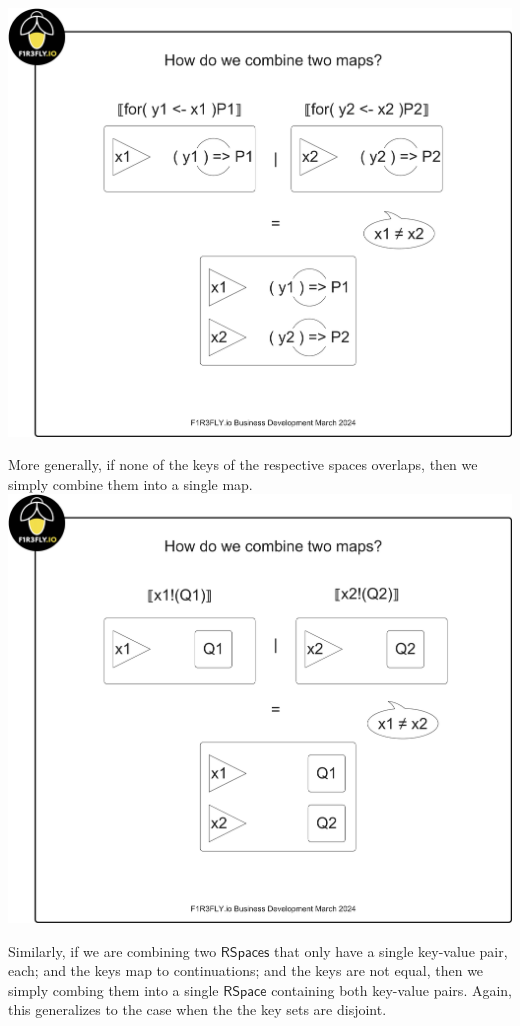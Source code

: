 \includegraphics[scale=0.25]{RHO20RSpaceSlide2.pdf}

More generally, if none of the keys of the respective spaces overlaps,
then we simply combine them into a single map. \\

\includegraphics[scale=0.25]{RHO20RSpaceSlide3.pdf}

Similarly, if we are combining two $\mathsf{RSpaces}$ that only have a
single key-value pair, each; and the keys map to continuations; and
the keys are not equal, then we simply combing them into a single
$\mathsf{RSpace}$ containing both key-value pairs. Again, this
generalizes to the case when the the key sets are disjoint.

